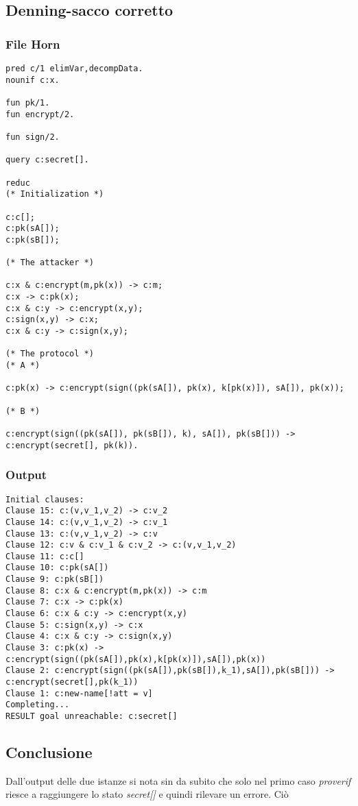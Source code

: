\documentclass[11pt]{article}
\begin{document}
\subsection{Denning-sacco corretto}
\label{sec:orgc496478}
\subsubsection{File Horn}
\label{sec:orgf160621}
\begin{verbatim}
pred c/1 elimVar,decompData.
nounif c:x.

fun pk/1.
fun encrypt/2.

fun sign/2.

query c:secret[].

reduc
(* Initialization *)

c:c[];
c:pk(sA[]);
c:pk(sB[]);

(* The attacker *)

c:x & c:encrypt(m,pk(x)) -> c:m;
c:x -> c:pk(x);
c:x & c:y -> c:encrypt(x,y);
c:sign(x,y) -> c:x;
c:x & c:y -> c:sign(x,y);

(* The protocol *)
(* A *)

c:pk(x) -> c:encrypt(sign((pk(sA[]), pk(x), k[pk(x)]), sA[]), pk(x));

(* B *)

c:encrypt(sign((pk(sA[]), pk(sB[]), k), sA[]), pk(sB[])) -> c:encrypt(secret[], pk(k)).
\end{verbatim}
\subsubsection{Output}
\label{sec:orgb95c92c}
\begin{verbatim}
Initial clauses:
Clause 15: c:(v,v_1,v_2) -> c:v_2
Clause 14: c:(v,v_1,v_2) -> c:v_1
Clause 13: c:(v,v_1,v_2) -> c:v
Clause 12: c:v & c:v_1 & c:v_2 -> c:(v,v_1,v_2)
Clause 11: c:c[]
Clause 10: c:pk(sA[])
Clause 9: c:pk(sB[])
Clause 8: c:x & c:encrypt(m,pk(x)) -> c:m
Clause 7: c:x -> c:pk(x)
Clause 6: c:x & c:y -> c:encrypt(x,y)
Clause 5: c:sign(x,y) -> c:x
Clause 4: c:x & c:y -> c:sign(x,y)
Clause 3: c:pk(x) -> c:encrypt(sign((pk(sA[]),pk(x),k[pk(x)]),sA[]),pk(x))
Clause 2: c:encrypt(sign((pk(sA[]),pk(sB[]),k_1),sA[]),pk(sB[])) -> c:encrypt(secret[],pk(k_1))
Clause 1: c:new-name[!att = v]
Completing...
RESULT goal unreachable: c:secret[]
\end{verbatim}
\subsection{Conclusione}
\label{sec:org64be261}
Dall'output delle due istanze si nota sin da subito che solo nel primo caso \emph{proverif} riesce a raggiungere lo stato \emph{secret[]} e quindi rilevare un errore. Ciò
\end{document}
